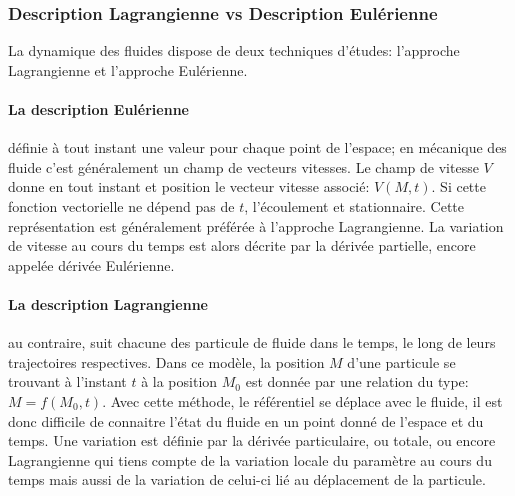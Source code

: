 \documentclass[10pt,a4paper]{article}
\begin{document}
\subsubsection{Description Lagrangienne vs Description Eulérienne}
La dynamique des fluides dispose de deux techniques d'études: l'approche Lagrangienne et l'approche Eulérienne.

\paragraph{La description Eulérienne\cite{desceuler}} définie à tout instant une valeur pour chaque point de l'espace; en mécanique des fluide c'est généralement un champ de vecteurs vitesses. Le champ de vitesse $V$ donne en tout instant et position le vecteur vitesse associé: $V(M, t)$. Si cette fonction vectorielle ne dépend pas de $t$, l'écoulement et stationnaire. Cette représentation est généralement préférée à l'approche Lagrangienne. La variation de vitesse au cours du temps est alors décrite par la dérivée partielle, encore appelée dérivée Eulérienne.

\paragraph{La description Lagrangienne\cite{desclagrange}} au contraire, suit chacune des particule de fluide dans le temps, le long de leurs trajectoires respectives. Dans ce modèle, la position $M$ d'une particule se trouvant à l'instant $t$ à la position $M_{0}$ est donnée par une relation du type: $M = f(M_{0}, t)$. Avec cette méthode, le référentiel se déplace avec le fluide, il est donc difficile de connaitre l'état du fluide en un point donné de l'espace et du temps. Une variation est définie par la dérivée particulaire, ou totale, ou encore Lagrangienne qui tiens compte de la variation locale du paramètre au cours du temps mais aussi de la variation de celui-ci lié au déplacement de la particule.
\end{document}
